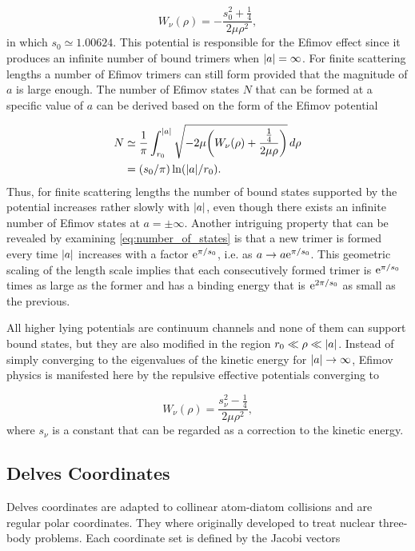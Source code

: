\begin{equation}\label{eq:efimov_channel}
W_{\nu}(\rho) = -\frac{s_0^2+\frac{1}{4}}{2\mu \rho^2},
\end{equation} 
in which $s_0 \simeq 1.00624$. This potential is responsible for the Efimov effect since it produces an infinite number of bound trimers when $\lvert a\rvert = \infty$. For finite scattering lengths a number of Efimov trimers can still form provided that the magnitude of $a$ is large enough. The number of Efimov states $N$ that can be formed at a specific value of $a$ can be derived based on the form of the Efimov potential \cite{WANG20131}

\begin{equation}\label{eq:number_of_states}
\begin{aligned}
N & \simeq \frac{1}{\pi} \int_{r_0}^{\lvert a\rvert} \sqrt{-2\mu\bigg(W_{\nu}(\rho) + \frac{\frac{1}{4}}{2\mu \rho}\bigg)} \,d\rho \\
&= (s_0/\pi)\ln(\lvert a\rvert/r_0).
\end{aligned}
\end{equation}
Thus, for finite scattering lengths the number of bound states supported by the potential increases rather slowly with $\lvert a\rvert$,
even though there exists an infinite number of Efimov states at $a=\pm \infty$. Another intriguing property that can be revealed by examining \eqref{eq:number_of_states} is that a new trimer is formed every time $\lvert a\rvert$ increases with a factor $\mathrm{e}^{\pi/s_0}$, i.e. as $a \rightarrow a\mathrm{e}^{\pi/s_0}$. This geometric scaling of the length scale implies that each consecutively formed trimer is $\mathrm{e}^{\pi/s_0}$ times as large as the former and has a binding energy that is $\mathrm{e}^{2\pi/s_0}$ as small as the previous. 

All higher lying potentials are continuum channels and none of them can support bound states, but they are also modified in the region $r_0 \ll \rho \ll \lvert a\rvert$. Instead of simply converging to the eigenvalues of the kinetic energy for $\lvert a\rvert \rightarrow \infty$, Efimov physics is manifested here by the repulsive effective potentials converging to 

\begin{equation}
W_{\nu}(\rho) = \frac{s_{\nu}^2-\frac{1}{4}}{2\mu \rho^2},
\end{equation} 
where $s_{\nu}$ is a constant that can be regarded as a correction to the kinetic energy. 
 
\subsection{Delves Coordinates}\label{delvescoord}
Delves coordinates are adapted to collinear atom-diatom collisions and are regular polar coordinates. They where originally developed to treat nuclear three-body problems. Each coordinate set is defined by the Jacobi vectors

